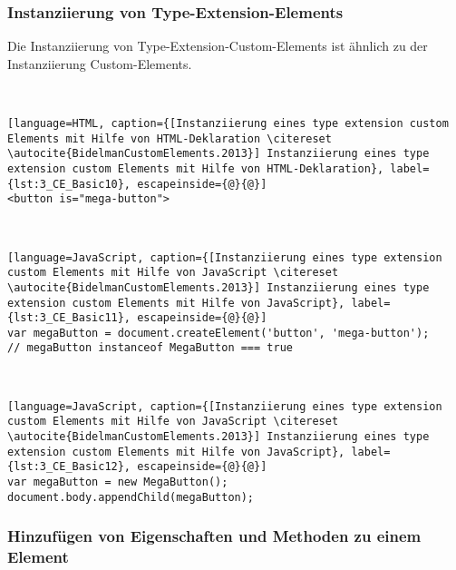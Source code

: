 \subsubsection{Instanziierung von Type-Extension-Elements}

Die Instanziierung von Type-Extension-Custom-Elements ist ähnlich zu der Instanziierung Custom-Elements.

\begin{enumerate}
 \hfill \\
\begin{lstlisting}[language=HTML, caption={[Instanziierung eines type extension custom Elements mit Hilfe von HTML-Deklaration \citereset \autocite{BidelmanCustomElements.2013}] Instanziierung eines type extension custom Elements mit Hilfe von HTML-Deklaration}, label={lst:3_CE_Basic10}, escapeinside={@}{@}]
<button is="mega-button">
\end{lstlisting}

 \hfill \\
\begin{lstlisting}[language=JavaScript, caption={[Instanziierung eines type extension custom Elements mit Hilfe von JavaScript \citereset \autocite{BidelmanCustomElements.2013}] Instanziierung eines type extension custom Elements mit Hilfe von JavaScript}, label={lst:3_CE_Basic11}, escapeinside={@}{@}]
var megaButton = document.createElement('button', 'mega-button');
// megaButton instanceof MegaButton === true
\end{lstlisting}

 \hfill \\
\begin{lstlisting}[language=JavaScript, caption={[Instanziierung eines type extension custom Elements mit Hilfe von JavaScript \citereset \autocite{BidelmanCustomElements.2013}] Instanziierung eines type extension custom Elements mit Hilfe von JavaScript}, label={lst:3_CE_Basic12}, escapeinside={@}{@}]
var megaButton = new MegaButton();
document.body.appendChild(megaButton);
\end{lstlisting}
\end{enumerate}

\subsubsection{Hinzufügen von Eigenschaften und Methoden zu einem Element}

